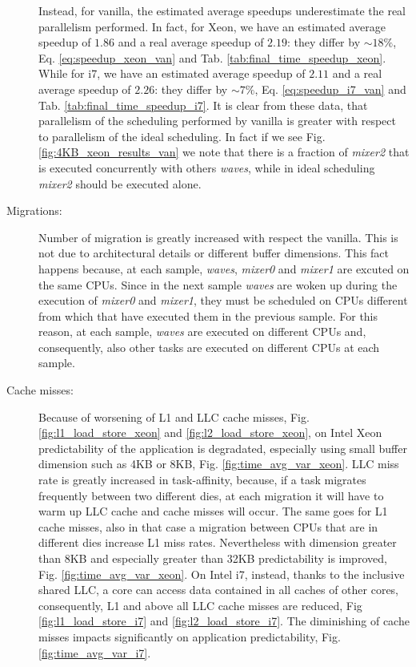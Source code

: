 \begin{description}
Instead, for vanilla, the estimated average speedups underestimate the real parallelism performed. In fact, for Xeon, we have an estimated average speedup 
of $1.86$ and a real average speedup of $2.19$: they differ by $\sim 18\%$, Eq. \ref{eq:speedup_xeon_van} and Tab. \ref{tab:final_time_speedup_xeon}. While 
for i7, we have an estimated average speedup of $2.11$ and a real average speedup of $2.26$: they differ by $\sim 7\%$, Eq. \ref{eq:speedup_i7_van} and 
Tab. \ref{tab:final_time_speedup_i7}. It is clear from these data, that parallelism of the scheduling performed by vanilla is greater with respect 
to parallelism of the ideal scheduling. In fact if we see Fig. \ref{fig:4KB_xeon_results_van} we note that there is a fraction of \textit{mixer2} that is 
executed concurrently with others \textit{waves}, while in ideal scheduling \textit{mixer2} should be executed alone.

\item[Migrations:] Number of migration is greatly increased with respect the vanilla. This is not due to architectural details or different buffer 
dimensions. This fact happens because, at each sample, \textit{waves}, \textit{mixer0} and \textit{mixer1} are excuted on the same CPUs. Since in the 
next sample \textit{waves} are woken up during the execution of \textit{mixer0} and \textit{mixer1}, they must be scheduled on CPUs different from which 
that have executed them in the previous sample. For this reason, at each sample, \textit{waves} are executed on different CPUs and, consequently, also 
other tasks are executed on different CPUs at each sample.

\item[Cache misses:] Because of worsening of L1 and LLC cache misses, Fig. \ref{fig:l1_load_store_xeon} and \ref{fig:l2_load_store_xeon}, on Intel Xeon 
predictability of the application is degradated, especially using small buffer dimension such as 4KB or 8KB, Fig. \ref{fig:time_avg_var_xeon}. LLC miss rate
is greatly increased in task-affinity, because, if a task migrates frequently between two different dies, at each migration it will have to warm up LLC 
cache and cache misses will occur. The same goes for L1 cache misses, also in that case a migration between CPUs that are in different dies increase L1 
miss rates. Nevertheless with dimension greater than 8KB and especially greater than 32KB predictability is improved, Fig. \ref{fig:time_avg_var_xeon}. On 
Intel i7, instead, thanks to the inclusive shared LLC, a core can access data contained in all caches of other cores, consequently, L1 and above all LLC 
cache misses are reduced, Fig \ref{fig:l1_load_store_i7} and \ref{fig:l2_load_store_i7}. The diminishing of cache misses impacts significantly on 
application predictability, Fig.\ref{fig:time_avg_var_i7}.


\end{description}
